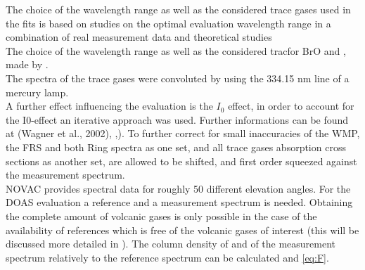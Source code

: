 \documentclass  [
  paper    = a4,
  BCOR     = 10mm,
  twoside,
  fontsize = 12pt,
  fleqn,
  toc      = bibnumbered,
  toc      = listofnumbered,
  numbers  = noendperiod,
  headings = normal,
  listof   = leveldown,
  version  = 3.03
]                                       {scrreprt}
\begin{document}
	The choice of the wavelength range as well as the considered trace gases used in the fits is based on studies on the optimal evaluation wavelength range in a combination of real measurement data and theoretical studies \\
	The choice of the wavelength range as well as the considered tracfor BrO and , made by \citet{vogel2011volcanic}.\\
	The spectra of the trace gases were convoluted by using the 334.15 nm line of a mercury lamp.\\
	A further effect influencing the evaluation is the $I_{0}$ effect, in order to account for the I0-effect \citep{platt2008differential} an iterative approach was used. Further informations can be found at (Wagner et al., 2002), \cite{lubcke2014bro},\cite{vogel2011volcanic}).
	To further correct for small inaccuracies of the WMP, the FRS and both Ring spectra as one set, and all trace gases absorption cross sections as another set, are allowed to be shifted, and first order squeezed against the measurement spectrum.\\
	NOVAC provides spectral data for roughly 50 different elevation angles. For the DOAS evaluation a reference and a measurement spectrum is needed. Obtaining the complete amount of volcanic gases is only possible in the case of the availability of references which is free of the volcanic gases of interest (this will be discussed more detailed in ). The column density of    and  of the measurement spectrum relatively to the reference spectrum can be calculated  and \ref{eq:F}. \\
	\\
\end{document}
